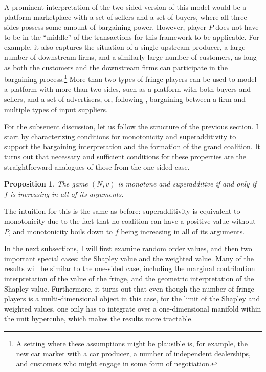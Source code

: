 \documentclass[a4paper]{article}
\newtheorem{proposition}{Proposition}
\begin{document}
A prominent interpretation of the two-sided version of this model would be a platform marketplace with a set of sellers and a set of buyers, where all three sides possess some amount of bargaining power.
However, player $P$ does not have to be in the ``middle'' of the transactions for this framework to be applicable.
For example, it also captures the situation of a single upstream producer, a large number of downstream firms, and a similarly large number of customers, as long as both the customers and the downstream firms can participate in the bargaining process.\footnote{
    A setting where these assumptions might be plausible is, for example, the new car market with a car producer, a number of independent dealerships, and customers who might engage in some form of negotiation.
}
More than two types of fringe players can be used to model a platform with more than two sides, such as a platform with both buyers and sellers, and a set of advertisers, or, following \textcite{stole1996intra}, bargaining between a firm and multiple types of input suppliers.

For the subseuent discussion, let us follow the structure of the previous section.
I start by characterizing conditions for monotonicity and superadditivity to support the bargaining interpretation and the formation of the grand coalition.
It turns out that necessary and sufficient conditions for these properties are the straightforward analogues of those from the one-sided case.
\begin{proposition}
    The game $(N, v)$ is monotone and superadditive if and only if $f$ is increasing in all of its arguments.
\end{proposition}
The intuition for this is the same as before: superadditivity is equivalent to monotonicity due to the fact that no coalition can have a positive value without $P$, and monotonicity boils down to $f$ being increasing in all of its arguments.

In the next subsections, I will first examine random order values, and then two important special cases: the Shapley value and the weighted value.
Many of the results will be similar to the one-sided case, including the marginal contribution interpretation of the value of the fringe, and the geometric interpretation of the Shapley value.
Furthermore, it turns out that even though the number of fringe players is a multi-dimensional object in this case, for the limit of the Shapley and weighted values, one only has to integrate over a one-dimensional manifold within the unit hypercube, which makes the results more tractable.
\end{document}
